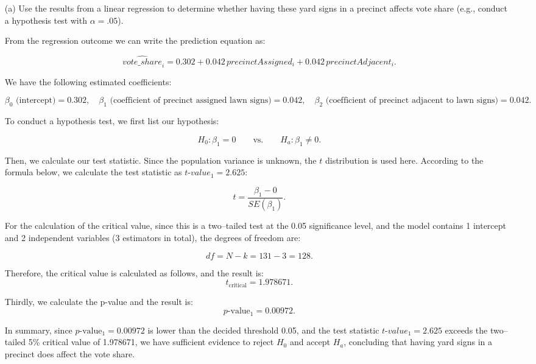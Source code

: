 \documentclass[12pt,letterpaper]{article}
\begin{document}
	\vspace{.5cm}
	
	\begin{enumerate}
		\item [(a)] Use the results from a linear regression to determine whether having these yard signs in a precinct affects vote share (e.g., conduct a hypothesis test with $\alpha = .05$).
		
		\vspace{.3cm}
		From the regression outcome we can write the prediction equation as:
		
		\[
		\widehat{vote\_share}_i = 0.302 + 0.042\, precinctAssigned_i + 0.042\, precinctAdjacent_i.
		\]
		
		We have the following estimated coefficients:
		
		\[
		\beta_0 \text{ (intercept)} = 0.302,\quad \beta_1 \text{ (coefficient of precinct assigned lawn signs)} = 0.042,\quad \beta_2 \text{ (coefficient of precinct adjacent to lawn signs)} = 0.042.
		\]
		
		To conduct a hypothesis test, we first list our hypothesis:
		
		\[
		H_0: \beta_1 = 0 \qquad\text{vs.}\qquad H_a: \beta_1 \neq 0.
		\]
		
		Then, we calculate our test statistic. Since the population variance is unknown, the $t$ distribution is used here. According to the formula below, we calculate the test statistic as $\textit{t-value}_1 = 2.625$:
		
		\[
		t = \frac{\beta_1 - 0}{SE(\beta_1)}.
		\]
		
		For the calculation of the critical value, since this is a two–tailed test at the 0.05 significance level, and the model contains 1 intercept and 2 independent variables (3 estimators in total), the degrees of freedom are:
		
		\[
		df = N - k = 131 - 3 = 128.
		\]
		
		Therefore, the critical value is calculated as follows, and the result is:
		\[
		t_{\text{critical}} = 1.978671.
		\]
		
		
		
		Thirdly, we calculate the p-value and the result is:
		\[
		p\text{-value}_1 = 0.00972.
		\]
		
		
		
		In summary, since $p\text{-value}_1 = 0.00972$ is lower than the decided threshold 0.05, and the test statistic $\textit{t-value}_1 = 2.625$ exceeds the two–tailed 5\% critical value of 1.978671, we have sufficient evidence to reject $H_0$ and accept $H_a$, concluding that having yard signs in a precinct does affect the vote share.
		

\end{enumerate}
\end{document}
